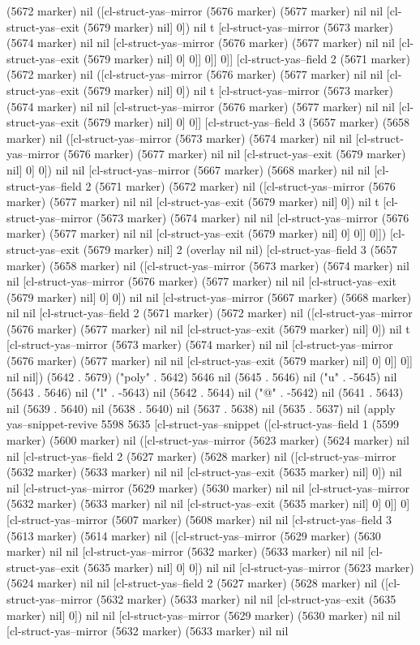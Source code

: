 (5672 marker) nil ([cl-struct-yas--mirror (5676 marker) (5677 marker) nil nil [cl-struct-yas--exit (5679 marker) nil] 0]) nil t [cl-struct-yas--mirror (5673 marker) (5674 marker) nil nil [cl-struct-yas--mirror (5676 marker) (5677 marker) nil nil [cl-struct-yas--exit (5679 marker) nil] 0] 0]] 0]] 0]] [cl-struct-yas--field 2 (5671 marker) (5672 marker) nil ([cl-struct-yas--mirror (5676 marker) (5677 marker) nil nil [cl-struct-yas--exit (5679 marker) nil] 0]) nil t [cl-struct-yas--mirror (5673 marker) (5674 marker) nil nil [cl-struct-yas--mirror (5676 marker) (5677 marker) nil nil [cl-struct-yas--exit (5679 marker) nil] 0] 0]] [cl-struct-yas--field 3 (5657 marker) (5658 marker) nil ([cl-struct-yas--mirror (5673 marker) (5674 marker) nil nil [cl-struct-yas--mirror (5676 marker) (5677 marker) nil nil [cl-struct-yas--exit (5679 marker) nil] 0] 0]) nil nil [cl-struct-yas--mirror (5667 marker) (5668 marker) nil nil [cl-struct-yas--field 2 (5671 marker) (5672 marker) nil ([cl-struct-yas--mirror (5676 marker) (5677 marker) nil nil [cl-struct-yas--exit (5679 marker) nil] 0]) nil t [cl-struct-yas--mirror (5673 marker) (5674 marker) nil nil [cl-struct-yas--mirror (5676 marker) (5677 marker) nil nil [cl-struct-yas--exit (5679 marker) nil] 0] 0]] 0]]) [cl-struct-yas--exit (5679 marker) nil] 2 (overlay nil nil) [cl-struct-yas--field 3 (5657 marker) (5658 marker) nil ([cl-struct-yas--mirror (5673 marker) (5674 marker) nil nil [cl-struct-yas--mirror (5676 marker) (5677 marker) nil nil [cl-struct-yas--exit (5679 marker) nil] 0] 0]) nil nil [cl-struct-yas--mirror (5667 marker) (5668 marker) nil nil [cl-struct-yas--field 2 (5671 marker) (5672 marker) nil ([cl-struct-yas--mirror (5676 marker) (5677 marker) nil nil [cl-struct-yas--exit (5679 marker) nil] 0]) nil t [cl-struct-yas--mirror (5673 marker) (5674 marker) nil nil [cl-struct-yas--mirror (5676 marker) (5677 marker) nil nil [cl-struct-yas--exit (5679 marker) nil] 0] 0]] 0]] nil nil]) (5642 . 5679) ("poly" . 5642) 5646 nil (5645 . 5646) nil ("u" . -5645) nil (5643 . 5646) nil ("l" . -5643) nil (5642 . 5644) nil ("@" . -5642) nil (5641 . 5643) nil (5639 . 5640) nil (5638 . 5640) nil (5637 . 5638) nil (5635 . 5637) nil (apply yas--snippet-revive 5598 5635 [cl-struct-yas--snippet ([cl-struct-yas--field 1 (5599 marker) (5600 marker) nil ([cl-struct-yas--mirror (5623 marker) (5624 marker) nil nil [cl-struct-yas--field 2 (5627 marker) (5628 marker) nil ([cl-struct-yas--mirror (5632 marker) (5633 marker) nil nil [cl-struct-yas--exit (5635 marker) nil] 0]) nil nil [cl-struct-yas--mirror (5629 marker) (5630 marker) nil nil [cl-struct-yas--mirror (5632 marker) (5633 marker) nil nil [cl-struct-yas--exit (5635 marker) nil] 0] 0]] 0] [cl-struct-yas--mirror (5607 marker) (5608 marker) nil nil [cl-struct-yas--field 3 (5613 marker) (5614 marker) nil ([cl-struct-yas--mirror (5629 marker) (5630 marker) nil nil [cl-struct-yas--mirror (5632 marker) (5633 marker) nil nil [cl-struct-yas--exit (5635 marker) nil] 0] 0]) nil nil [cl-struct-yas--mirror (5623 marker) (5624 marker) nil nil [cl-struct-yas--field 2 (5627 marker) (5628 marker) nil ([cl-struct-yas--mirror (5632 marker) (5633 marker) nil nil [cl-struct-yas--exit (5635 marker) nil] 0]) nil nil [cl-struct-yas--mirror (5629 marker) (5630 marker) nil nil [cl-struct-yas--mirror (5632 marker) (5633 marker) nil nil 